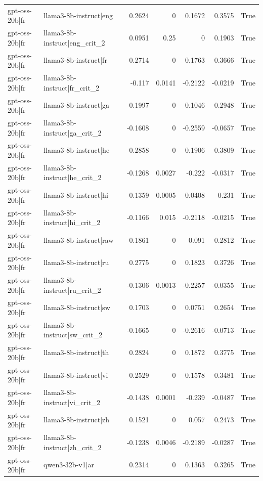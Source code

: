 \begin{table}
\begin{tabular}{l l r r r r l}
gpt-oss-20b|fr & llama3-8b-instruct|eng & 0.2624 & 0 & 0.1672 & 0.3575 & True \\
gpt-oss-20b|fr & llama3-8b-instruct|eng_crit_2 & 0.0951 & 0.25 & 0 & 0.1903 & True \\
gpt-oss-20b|fr & llama3-8b-instruct|fr & 0.2714 & 0 & 0.1763 & 0.3666 & True \\
gpt-oss-20b|fr & llama3-8b-instruct|fr_crit_2 & -0.117 & 0.0141 & -0.2122 & -0.0219 & True \\
gpt-oss-20b|fr & llama3-8b-instruct|ga & 0.1997 & 0 & 0.1046 & 0.2948 & True \\
gpt-oss-20b|fr & llama3-8b-instruct|ga_crit_2 & -0.1608 & 0 & -0.2559 & -0.0657 & True \\
gpt-oss-20b|fr & llama3-8b-instruct|he & 0.2858 & 0 & 0.1906 & 0.3809 & True \\
gpt-oss-20b|fr & llama3-8b-instruct|he_crit_2 & -0.1268 & 0.0027 & -0.222 & -0.0317 & True \\
gpt-oss-20b|fr & llama3-8b-instruct|hi & 0.1359 & 0.0005 & 0.0408 & 0.231 & True \\
gpt-oss-20b|fr & llama3-8b-instruct|hi_crit_2 & -0.1166 & 0.015 & -0.2118 & -0.0215 & True \\
gpt-oss-20b|fr & llama3-8b-instruct|raw & 0.1861 & 0 & 0.091 & 0.2812 & True \\
gpt-oss-20b|fr & llama3-8b-instruct|ru & 0.2775 & 0 & 0.1823 & 0.3726 & True \\
gpt-oss-20b|fr & llama3-8b-instruct|ru_crit_2 & -0.1306 & 0.0013 & -0.2257 & -0.0355 & True \\
gpt-oss-20b|fr & llama3-8b-instruct|sw & 0.1703 & 0 & 0.0751 & 0.2654 & True \\
gpt-oss-20b|fr & llama3-8b-instruct|sw_crit_2 & -0.1665 & 0 & -0.2616 & -0.0713 & True \\
gpt-oss-20b|fr & llama3-8b-instruct|th & 0.2824 & 0 & 0.1872 & 0.3775 & True \\
gpt-oss-20b|fr & llama3-8b-instruct|vi & 0.2529 & 0 & 0.1578 & 0.3481 & True \\
gpt-oss-20b|fr & llama3-8b-instruct|vi_crit_2 & -0.1438 & 0.0001 & -0.239 & -0.0487 & True \\
gpt-oss-20b|fr & llama3-8b-instruct|zh & 0.1521 & 0 & 0.057 & 0.2473 & True \\
gpt-oss-20b|fr & llama3-8b-instruct|zh_crit_2 & -0.1238 & 0.0046 & -0.2189 & -0.0287 & True \\
gpt-oss-20b|fr & qwen3-32b-v1|ar & 0.2314 & 0 & 0.1363 & 0.3265 & True \\

\end{tabular}
\end{table}
